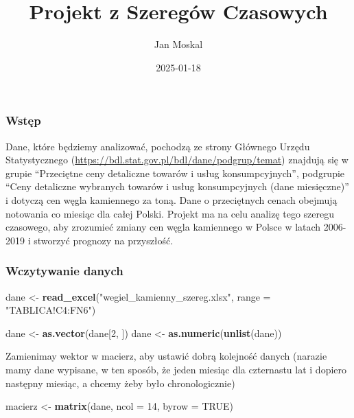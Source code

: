\documentclass[
]{article}
\title{Projekt z Szeregów Czasowych}
\author{Jan Moskal}
\date{2025-01-18}
\newenvironment{Shaded}{\begin{snugshade}}{\end{snugshade}}
\newcommand{\AttributeTok}[1]{\textcolor[rgb]{0.13,0.29,0.53}{#1}}
\newcommand{\ConstantTok}[1]{\textcolor[rgb]{0.56,0.35,0.01}{#1}}
\newcommand{\DecValTok}[1]{\textcolor[rgb]{0.00,0.00,0.81}{#1}}
\newcommand{\FunctionTok}[1]{\textcolor[rgb]{0.13,0.29,0.53}{\textbf{#1}}}
\newcommand{\NormalTok}[1]{#1}
\newcommand{\OtherTok}[1]{\textcolor[rgb]{0.56,0.35,0.01}{#1}}
\newcommand{\StringTok}[1]{\textcolor[rgb]{0.31,0.60,0.02}{#1}}
\begin{document}
\maketitle

\subsubsection{Wstęp}\label{wstux119p}

Dane, które będziemy analizować, pochodzą ze strony Głównego Urzędu
Statystycznego (\url{https://bdl.stat.gov.pl/bdl/dane/podgrup/temat})
znajdują się w grupie ``Przeciętne ceny detaliczne towarów i usług
konsumpcyjnych'', podgrupie ``Ceny detaliczne wybranych towarów i usług
konsumpcyjnych (dane miesięczne)'' i dotyczą cen węgla kamiennego za
toną. Dane o przeciętnych cenach obejmują notowania co miesiąc dla całej
Polski. Projekt ma na celu analizę tego szeregu czasowego, aby zrozumieć
zmiany cen węgla kamiennego w Polsce w latach 2006-2019 i stworzyć
prognozy na przyszłość.

\subsubsection{Wczytywanie danych}\label{wczytywanie-danych}

\begin{Shaded}
\begin{Highlighting}[]
\NormalTok{dane }\OtherTok{\textless{}{-}} \FunctionTok{read\_excel}\NormalTok{(}\StringTok{"wegiel\_kamienny\_szereg.xlsx"}\NormalTok{, }\AttributeTok{range =} \StringTok{"TABLICA!C4:FN6"}\NormalTok{)}

\NormalTok{dane }\OtherTok{\textless{}{-}} \FunctionTok{as.vector}\NormalTok{(dane[}\DecValTok{2}\NormalTok{, ])}
\NormalTok{dane }\OtherTok{\textless{}{-}} \FunctionTok{as.numeric}\NormalTok{(}\FunctionTok{unlist}\NormalTok{(dane))}
\end{Highlighting}
\end{Shaded}

Zamienimay wektor w macierz, aby ustawić dobrą kolejność danych (narazie
mamy dane wypisane, w ten sposób, że jeden miesiąc dla czternastu lat i
dopiero następny miesiąc, a chcemy żeby było chronologicznie)

\begin{Shaded}
\begin{Highlighting}[]
\NormalTok{macierz }\OtherTok{\textless{}{-}} \FunctionTok{matrix}\NormalTok{(dane, }\AttributeTok{ncol =} \DecValTok{14}\NormalTok{, }\AttributeTok{byrow =} \ConstantTok{TRUE}\NormalTok{)}
\end{Highlighting}
\end{Shaded}
\end{document}

